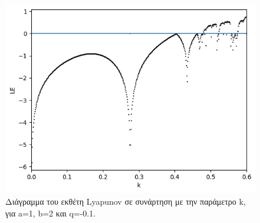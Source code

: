\begin{figure}[h!]
	\centering
	\includegraphics[width=0.6\linewidth]{"LateX images/graphs/g6 "}
	\caption{Διάγραμμα του εκθέτη Lyapunov σε συνάρτηση με την παράμετρο k, για a=1, b=2 και q=-0.1.}
	\label{f:g7}
\end{figure}



